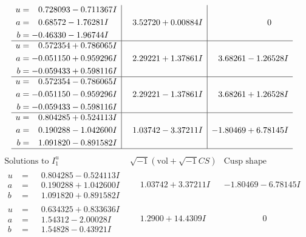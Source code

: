 \documentclass[1p]{elsarticle_modified}
\theoremstyle{definition}
\newcommand{\I}{\sqrt{-1}}
\begin{document}
$$\begin{array}{c|c|c}
\begin{aligned}
u &= \phantom{-}0.728093 - 0.711367 I \\
a &= \phantom{-}0.68572 - 1.76281 I \\
b &= -0.46330 - 1.96744 I\end{aligned}
 & \phantom{-}3.52720 + 0.00884 I & \phantom{-0.000000 } 0 \\ \hline\begin{aligned}
u &= \phantom{-}0.572354 + 0.786065 I \\
a &= -0.051150 + 0.959296 I \\
b &= -0.059433 + 0.598116 I\end{aligned}
 & \phantom{-}2.29221 + 1.37861 I & \phantom{-}3.68261 - 1.26528 I \\ \hline\begin{aligned}
u &= \phantom{-}0.572354 - 0.786065 I \\
a &= -0.051150 - 0.959296 I \\
b &= -0.059433 - 0.598116 I\end{aligned}
 & \phantom{-}2.29221 - 1.37861 I & \phantom{-}3.68261 + 1.26528 I \\ \hline\begin{aligned}
u &= \phantom{-}0.804285 + 0.524113 I \\
a &= \phantom{-}0.190288 - 1.042600 I \\
b &= \phantom{-}1.091820 - 0.891582 I\end{aligned}
 & \phantom{-}1.03742 - 3.37211 I & -1.80469 + 6.78145 I\\
 \hline 
 \end{array}$$\newpage$$\begin{array}{c|c|c}  
\text{Solutions to }I^u_{1}& \I (\text{vol} + \sqrt{-1}CS) & \text{Cusp shape}\\
 \hline 
\begin{aligned}
u &= \phantom{-}0.804285 - 0.524113 I \\
a &= \phantom{-}0.190288 + 1.042600 I \\
b &= \phantom{-}1.091820 + 0.891582 I\end{aligned}
 & \phantom{-}1.03742 + 3.37211 I & -1.80469 - 6.78145 I \\ \hline\begin{aligned}
u &= \phantom{-}0.634325 + 0.833636 I \\
a &= \phantom{-}1.54312 - 2.00028 I \\
b &= \phantom{-}1.54828 - 0.43921 I\end{aligned}
 & \phantom{-}1.2900 + 14.4309 I & \phantom{-0.000000 } 0 \\ \hline\begin{aligned}

\end{aligned}
\end{array}$$
\end{document}

